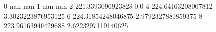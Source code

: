 0 nan nan
1 nan nan
2 221.3393096923828 0.0
4 224.64163208007812 3.3023223876953125
6 224.31854248046875 2.9792327880859375
8 223.96163940429688 2.6223297119140625
